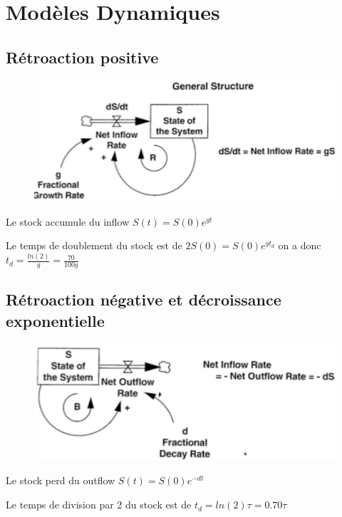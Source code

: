 \documentclass[resume]{subfiles}
\begin{document}
\section{Modèles Dynamiques}

\subsection{Rétroaction positive}

\begin{figure}[H]
    \centering
    \includegraphics[width=1\columnwidth]{Figures/FDM_1.png}
\end{figure}

Le stock accumule du inflow $S(t)=S(0)e^{gt}$ 

Le temps de doublement du stock est de $2S(0)=S(0)e^{gt_d}$ on a donc $t_d=\frac{ln(2)}{g}=\frac{70}{100g}$

\subsection{Rétroaction négative et décroissance exponentielle}

\begin{figure}[H]
    \centering
    \includegraphics[width=1\columnwidth]{Figures/FDM_2.png}
\end{figure}

Le stock perd du outflow $S(t)=S(0)e^{-dt}$ 

Le temps de division par 2 du stock est de $t_d=ln(2)\tau=0.70\tau$ 
\end{document}
